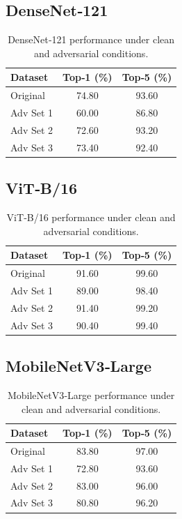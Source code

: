 \documentclass[twoside,11pt]{article}
\begin{document}
\subsection{DenseNet‑121}
\begin{table}[H]
  \centering
  \begin{tabular}{lcc}
    \toprule
    Dataset & Top‑1 (\%) & Top‑5 (\%) \\
    \midrule
    Original  & 74.80 & 93.60 \\
    Adv Set 1 & 60.00 & 86.80 \\
    Adv Set 2 & 72.60 & 93.20 \\
    Adv Set 3 & 73.40 & 92.40 \\
    \bottomrule
  \end{tabular}
  \caption{DenseNet‑121 performance under clean and adversarial conditions.}
  \label{tab:densenet121-results}
\end{table}

\subsection{ViT‑B/16}
\begin{table}[H]
  \centering
  \begin{tabular}{lcc}
    \toprule
    Dataset & Top‑1 (\%) & Top‑5 (\%) \\
    \midrule
    Original  & 91.60 & 99.60 \\
    Adv Set 1 & 89.00 & 98.40 \\
    Adv Set 2 & 91.40 & 99.20 \\
    Adv Set 3 & 90.40 & 99.40 \\
    \bottomrule
  \end{tabular}
  \caption{ViT‑B/16 performance under clean and adversarial conditions.}
  \label{tab:vitb16-results}
\end{table}

\subsection{MobileNetV3‑Large}
\begin{table}[H]
  \centering
  \begin{tabular}{lcc}
    \toprule
    Dataset & Top‑1 (\%) & Top‑5 (\%) \\
    \midrule
    Original  & 83.80 & 97.00 \\
    Adv Set 1 & 72.80 & 93.60 \\
    Adv Set 2 & 83.00 & 96.00 \\
    Adv Set 3 & 80.80 & 96.20 \\
    \bottomrule
  \end{tabular}
  \caption{MobileNetV3‑Large performance under clean and adversarial conditions.}
  \label{tab:mobilenetv3-results}
\end{table}
\end{document}
